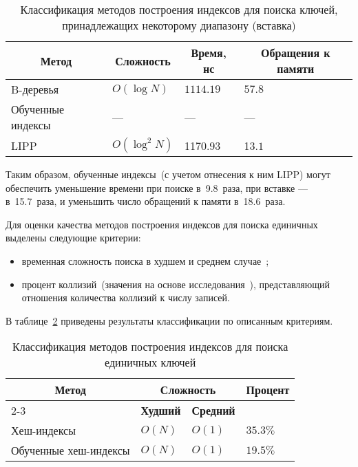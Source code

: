 {
\captionsetup{format=hang,justification=raggedleft,
              singlelinecheck=off,width=17cm}
\begin{longtable}[Hc]{|p{5cm}|p{2cm}|p{2cm}|p{2cm}|}
\caption{Классификация методов построения индексов для поиска ключей,
принадлежащих некоторому диапазону (вставка)\label{tab:02}}\\
    \hline
    \multicolumn{1}{|c|}{\textbf{Метод}} &
    \multicolumn{1}{c|}{\textbf{Сложность}} &
    \multicolumn{1}{c|}{\textbf{Время, нс}} &
    \multicolumn{1}{c|}{\parbox{3cm}{\vspace{2mm}\centering\textbf{Обращения к
    памяти}}}\\[2.5ex]
    \hline
    B-деревья
    & $O(\log N)$
    & $1114.19$
    & $57.8$\\
    \hline
    Обученные индексы
    & ---
    & ---
    & ---\\
    \hline
    LIPP 
    & $O(\log^2 N)$
    & \color{white}11\color{black}$70.93$
    & \color{white}1\color{black}$3.1$\\
    \hline
\end{longtable}
}

Таким образом, обученные индексы~(с учетом отнесения к ним LIPP) могут
обеспечить уменьшение времени при поиске в~9.8~раза, при вставке ---
в~15.7~раза, и уменьшить число обращений к памяти в~18.6~раза.

Для оценки качества методов построения индексов для поиска единичных выделены
следующие критерии:
\begin{itemize}
    \item временная сложность поиска в худшем и среднем случае~\cite{main,
        squares};
    \item процент коллизий~(значения на основе исследования~\cite{main}),
        представляющий отношения количества коллизий к числу записей.
        
\end{itemize}

В таблице~\ref{tab:03} приведены результаты классификации по описанным
критериям.

{
\captionsetup{format=hang,justification=raggedleft,
              singlelinecheck=off,width=17cm}
\begin{longtable}[Hc]{|p{5.3cm}|p{2cm}|p{2cm}|p{2cm}|}
\caption{Классификация методов построения индексов для поиска единичных
ключей\label{tab:03}}\\
    \hline
    \multicolumn{1}{|c|}{\multirow{2}{*}{\textbf{Метод}}} &
    \multicolumn{2}{c|}{\textbf{Сложность}} &
    \multicolumn{1}{c|}{\multirow{2}{*}{\parbox{2cm}{\textbf{Процент}}}}\\
    \cline{2-3}
    & \multicolumn{1}{c|}{\textbf{Худший}}
    & \multicolumn{1}{c|}{\textbf{Средний}}
    &\\
    \hline
    Хеш-индексы
    & $O(N)$
    & $O(1)$
    & $35.3\%$\\
    \hline
    Обученные хеш-индексы
    & $O(N)$
    & $O(1)$
    & $19.5\%$\\
    \hline
\end{longtable}
}

